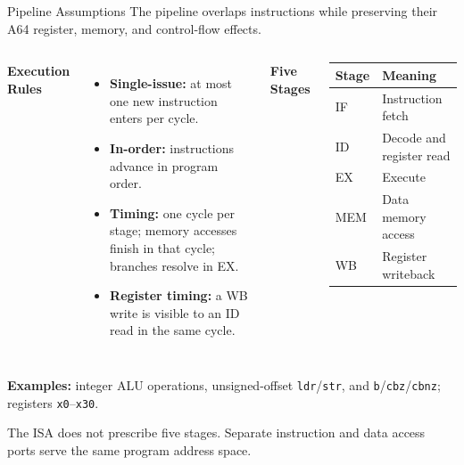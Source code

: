 \documentclass[aspectratio=169,11pt,t]{beamer}
\newcommand{\key}[1]{\textbf{#1}}
\newcommand{\code}[1]{\texttt{#1}}
\begin{document}
\begin{frame}{Pipeline Assumptions}
\small
The pipeline overlaps instructions while preserving their A64 register, memory, and control-flow effects.
\vspace{.08cm}
\begin{columns}[T,onlytextwidth]
\key{Execution Rules}
\begin{itemize}\setlength{\itemsep}{5pt}
  \item \key{Single-issue:} at most one new instruction enters per cycle.
  \item \key{In-order:} instructions advance in program order.
  \item \key{Timing:} one cycle per stage; memory accesses finish in that cycle; branches resolve in EX.
  \item \key{Register timing:} a WB write is visible to an ID read in the same cycle.
\end{itemize}
\key{Five Stages}
\par\vspace{3pt}
\renewcommand{\arraystretch}{1.16}
\begin{tabular}{@{}ll@{}}
\toprule
\rowcolor{white}
\textbf{Stage} & \textbf{Meaning} \\
\midrule
IF & Instruction fetch \\
ID & Decode and register read \\
EX & Execute \\
MEM & Data memory access \\
WB & Register writeback \\
\bottomrule
\end{tabular}
\end{columns}
\vspace{.10cm}
\key{Examples:} integer ALU operations, unsigned-offset \code{ldr}/\code{str}, and \code{b}/\code{cbz}/\code{cbnz}; registers \code{x0}--\code{x30}.
\par\vspace{.12cm}
The ISA does not prescribe five stages. Separate instruction and data access ports serve the same program address space.
\end{frame}
\end{document}
